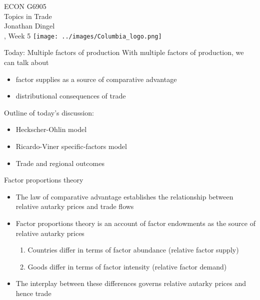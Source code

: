 \documentclass[11pt,notes=hide,aspectratio=169]{beamer}
\begin{document}
\begin{frame}[plain]
\begin{center}
\large
\textcolor{columbiadarkblue}{ECON G6905\\
Topics in Trade\\ 
Jonathan Dingel\\
\semester, Week 5}
\vfill 
\texttt{[image: ../images/Columbia\_logo.png]}
\end{center}
\end{frame}
\begin{frame}{Today: Multiple factors of production}
With multiple factors of production, we can talk about
\begin{itemize}
	\item factor supplies as a source of comparative advantage
	\item distributional consequences of trade
\end{itemize}
Outline of today's discussion:
\begin{itemize}
	\item Heckscher-Ohlin model
	\item Ricardo-Viner specific-factors model
	\item Trade and regional outcomes
\end{itemize}
\end{frame}
\begin{frame}{Factor proportions theory}
\begin{itemize}
	\item The law of comparative advantage establishes the relationship between relative autarky prices and trade flows
	\item Factor proportions theory is an account of factor endowments as the source of relative autarky prices
	\begin{enumerate}
		\item Countries differ in terms of factor abundance (relative factor supply)
		\item Goods differ in terms of factor intensity (relative factor demand)
	\end{enumerate}
	\item The interplay between these differences governs relative autarky prices and hence trade
\end{itemize}
\end{frame}
\end{document}
